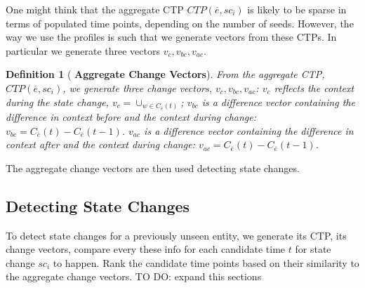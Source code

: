 \documentclass[11pt,a4paper]{article}
\newtheorem{definition}{Definition}
\newcommand{\highlight}[1]{{\color{red} #1}}
\begin{document}
One might think that the aggregate CTP $CTP(\overline{e}, sc_i)$ is likely to be sparse in terms of populated time points, depending on the number of seeds. However, the way we use the profiles is such that we generate vectors from these CTPs.  In particular we generate three vectors $v_c, v_{bc}, v_{ac}$.  

\begin{definition}[\textbf{  Aggregate Change Vectors}]
From the aggregate CTP, $CTP(\overline{e}, sc_i)$, we generate three change vectors, $v_c, v_{bc}, v_{ac}$:  $v_c$ reflects the context during the state change, $v_c = \cup_{w\in C_{\overline{e}}(t)}$; $v_{bc}$ is a difference vector containing the difference in context before and the context during change:  $v_{bc} = C_{\overline{e}}(t) - C_{\overline{e}}(t-1)  $.   $v_{ac}$ is a difference vector containing the difference in context after and the context during change:  $v_{ac} = C_{\overline{e}}(t) - C_{\overline{e}}(t-1)  $. 
\end{definition}

The aggregate change vectors are then used detecting state changes.

\subsection{Detecting State Changes}
To detect state changes for a previously unseen entity, we generate its CTP, its change vectors, compare every these info for each candidate time $t$ for state change $sc_i$ to happen. Rank the candidate time points based on their similarity to the aggregate change vectors. \highlight{ TO DO: expand this sections}
 
%
%
%
\end{document}
